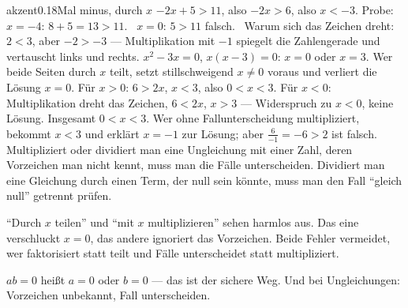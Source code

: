 \begin{loesungkarte}{akzent}{0.18}{Mal minus, durch $x$}
$-2x + 5 > 11$, also $-2x > 6$, also $x < -3$. Probe: $x = -4$: $8 + 5 = 13 > 11$. \checkmark\ $x = 0$: $5 > 11$ falsch. \checkmark\ Warum sich das Zeichen dreht: $2 < 3$, aber $-2 > -3$ --- Multiplikation mit $-1$ spiegelt die Zahlengerade und vertauscht links und rechts.
$x^{2} - 3x = 0$, $x(x - 3) = 0$: $x = 0$ oder $x = 3$. Wer beide Seiten durch $x$ teilt, setzt stillschweigend $x\neq0$ voraus und verliert die Lösung $x = 0$.
Für $x > 0$: $6 > 2x$, $x < 3$, also $0 < x < 3$. Für $x < 0$: Multiplikation dreht das Zeichen, $6 < 2x$, $x > 3$ --- Widerspruch zu $x < 0$, keine Lösung. Insgesamt $0 < x < 3$. Wer ohne Fallunterscheidung multipliziert, bekommt $x < 3$ und erklärt $x = -1$ zur Lösung; aber $\frac6{-1} = -6 > 2$ ist falsch.
Multipliziert oder dividiert man eine Ungleichung mit einer Zahl, deren Vorzeichen man nicht kennt, muss man die Fälle unterscheiden. Dividiert man eine Gleichung durch einen Term, der null sein könnte, muss man den Fall \enquote{gleich null} getrennt prüfen.
\begin{fehler}\kastentext
\enquote{Durch $x$ teilen} und \enquote{mit $x$ multiplizieren} sehen harmlos aus. Das eine verschluckt $x = 0$, das andere ignoriert das Vorzeichen. Beide Fehler vermeidet, wer faktorisiert statt teilt und Fälle unterscheidet statt multipliziert.
\end{fehler}
\begin{mitnehmen}\kastentext
$ab = 0$ heißt $a = 0$ oder $b = 0$ --- das ist der sichere Weg. Und bei Ungleichungen: Vorzeichen unbekannt, Fall unterscheiden.
\end{mitnehmen}
\end{loesungkarte}


